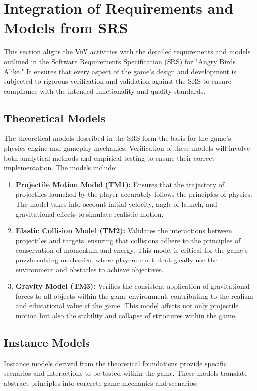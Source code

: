 \documentclass[12pt]{article}
\begin{document}
\section{Integration of Requirements and Models from SRS}

This section aligns the VnV activities with the detailed requirements and models outlined in the Software Requirements Specification (SRS) for "Angry Birds Alike." It ensures that every aspect of the game's design and development is subjected to rigorous verification and validation against the SRS to ensure compliance with the intended functionality and quality standards.

\subsection{Theoretical Models}
The theoretical models described in the SRS form the basis for the game's physics engine and gameplay mechanics. Verification of these models will involve both analytical methods and empirical testing to ensure their correct implementation. The models include:

\begin{enumerate}
    \item \textbf{Projectile Motion Model (TM1):} Ensures that the trajectory of projectiles launched by the player accurately follows the principles of physics. The model takes into account initial velocity, angle of launch, and gravitational effects to simulate realistic motion.
    \item \textbf{Elastic Collision Model (TM2):} Validates the interactions between projectiles and targets, ensuring that collisions adhere to the principles of conservation of momentum and energy. This model is critical for the game's puzzle-solving mechanics, where players must strategically use the environment and obstacles to achieve objectives.
    \item \textbf{Gravity Model (TM3):} Verifies the consistent application of gravitational forces to all objects within the game environment, contributing to the realism and educational value of the game. This model affects not only projectile motion but also the stability and collapse of structures within the game.
\end{enumerate}

\subsection{Instance Models}
Instance models derived from the theoretical foundations provide specific scenarios and interactions to be tested within the game. These models translate abstract principles into concrete game mechanics and scenarios:
\end{document}

